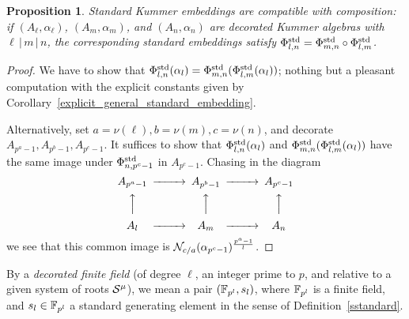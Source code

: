 \documentclass{sig-alternate}
\newtheorem{proposition}[theorem]{Proposition}
\begin{document}
\begin{proposition}
\label{standard_K_embeddings_compatibles}
Standard Kummer embeddings are compatible with composition:
if $(A_\ell,\alpha_\ell)$, $(A_m,\alpha_m)$, and $(A_n,\alpha_n)$ are decorated Kummer algebras
with $\ell\,|\,m\,|\,n$, the corresponding standard embeddings
satisfy ${\Phi^{\mathrm{std}}_{{l},{n}}}={\Phi^{\mathrm{std}}_{{m},{n}}}\circ{\Phi^{\mathrm{std}}_{{l},{m}}}$.
\end{proposition}
\begin{proof}
We have to show that ${\Phi^{\mathrm{std}}_{{l},{n}}}(\alpha_l)={\Phi^{\mathrm{std}}_{{m},{n}}}({\Phi^{\mathrm{std}}_{{l},{m}}}(\alpha_l))$;
nothing but a pleasant computation with the explicit constants given 
by Corollary~\ref{explicit_general_standard_embedding}.

Alternatively, set $a=\nu(\ell),b=\nu(m),c=\nu(n)$, and decorate $A_{p^a-1},A_{p^b-1},A_{p^c-1}$.
It suffices to show that ${\Phi^{\mathrm{std}}_{{l},{n}}}(\alpha_l)$
and ${\Phi^{\mathrm{std}}_{{m},{n}}}({\Phi^{\mathrm{std}}_{{l},{m}}}(\alpha_l))$ have the same image under ${\Phi^{\mathrm{std}}_{{n},{p^c-1}}}$
in $A_{p^c-1}$.
Chasing in the diagram
\begin{equation*}
\begin{CD}
A_{p^a-1} @>>> A_{p^b-1} @>>> A_{p^c-1} \\
@AAA @AAA @AAA\\
A_\ell @>>> A_m @>>> A_n
\end{CD}
\end{equation*}
we see that this common image
is $\mathcal{N}_{c/a}(\alpha_{p^c-1})^{\frac{p^a-1}{l}}$.
\end{proof}

By a \emph{decorated finite field} (of degree $\ell$, an integer prime to $p$,
and relative to a given system of roots $\mathcal{S}^\mu$),
we mean a pair $(\mathbb{F}_{p^l},s_l)$,
where $\mathbb{F}_{p^l}$ is a finite field,
and $s_l\in\mathbb{F}_{p^l}$ a standard generating element
in the sense of Definition~\ref{sstandard}.
\end{document}
